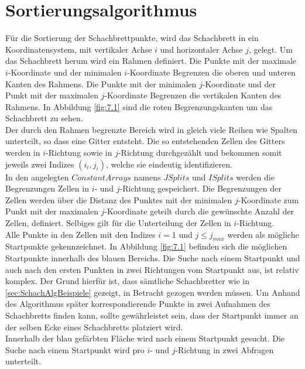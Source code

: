 \section{Sortierungsalgorithmus}

Für die Sortierung der Schachbrettpunkte, wird das Schachbrett in ein Koordinatensystem, mit vertikaler Achse $i$ und horizontaler Achse $j$, gelegt. Um das Schachbrett herum wird ein Rahmen definiert. Die Punkte mit der maximale $i$-Koordinate und der minimalen $i$-Koordinate Begrenzen die oberen und unteren Kanten des Rahmens. Die Punkte mit der minimalen $j$-Koordinate und der Punkt mit der  maximalen $j$-Koordinate Begrenzen die vertikalen Kanten des Rahmens. In Abbildung \ref{fig:7.1} sind die roten Begrenzungskanten um das Schachbrett zu sehen.\\

Der durch den Rahmen begrenzte Bereich wird in gleich viele Reihen wie Spalten unterteilt, so dass eine Gitter entsteht. Die so entstehenden Zellen des Gitters werden in $i$-Richtung sowie in $j$-Richtung durchgezählt und bekommen somit jeweils zwei Indizes $(i_i,j_i)$, welche sie eindeutig identifizieren.\\

In den angelegten $ConstantArrays$ namens $JSplits$ und $ISplits$ werden die Begrenzungen Zellen in $i$- und $j$-Richtung gespeichert. Die Begrenzungen der Zellen werden über die Distanz des Punktes mit der minimalen $j$-Koordinate zum Punkt mit der maximalen $j$-Koordinate geteilt durch die gewünschte Anzahl der Zellen, definiert. Selbiges gilt für die Unterteilung der Zellen in $i$-Richtung. \\ 

Alle Punkte in den Zellen mit den Indizes $i=1$ und $j \leq  j_{max}$ werden als mögliche Startpunkte gekennzeichnet. In Abbildung \ref{fig:7.1} befinden sich die möglichen Startpunkte innerhalb des blauen Bereichs. Die Suche nach einem Startpunkt und auch nach den ersten Punkten in zwei Richtungen vom Startpunkt aus, ist relativ komplex. Der Grund hierfür ist, dass sämtliche Schachbretter wie in \ref{sec:SchachAlgBeispiele} gezeigt, in Betracht gezogen werden müssen. Um Anhand des Algorithmus später korrespondierende Punkte in zwei Aufnahmen des Schachbretts finden kann, sollte gewährleistet sein, dass der Startpunkt immer an der selben Ecke eines Schachbretts platziert wird.\\

Innerhalb der blau gefärbten Fläche wird nach einem Startpunkt gesucht. Die Suche nach einem Startpunkt wird pro $i$- und $j$-Richtung in zwei Abfragen unterteilt.\\

